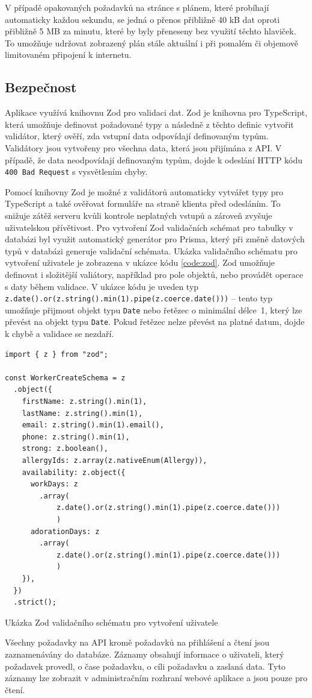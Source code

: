 V případě opakovaných požadavků na stránce s plánem, které probíhají automaticky každou sekundu, se jedná o přenos přibližně 40 kB dat oproti
přibližně 5 MB za minutu, které by byly přeneseny bez využití těchto hlaviček. To umožňuje udržovat zobrazený plán stále aktuální i při pomalém či objemově limitovaném
připojení k internetu.

\subsection{Bezpečnost}

Aplikace využívá knihovnu Zod pro validaci dat. Zod je knihovna pro TypeScript, která umožňuje definovat požadované typy a následně z těchto definic
vytvořit validátor, který ověří, zda vstupní data odpovídají definovaným typům. Validátory jsou vytvořeny pro všechna data, která jsou přijímána z API.
V případě, že data neodpovídají definovaným typům, dojde k odeslání HTTP kódu \texttt{400 Bad Request} s vysvětlením chyby.

Pomocí knihovny Zod je možné z validátorů automaticky vytvářet typy pro TypeScript a také ověřovat formuláře na straně klienta před odesláním.
To snižuje zátěž serveru kvůli kontrole neplatných vstupů a zároveň zvyšuje uživatelskou přívětivost.
Pro vytvoření Zod validačních schémat pro tabulky v databázi byl využit automatický generátor pro Prisma, který při změně datových typů v databázi
generuje validační schémata. Ukázka validačního schématu pro vytvoření uživatele je zobrazena v ukázce kódu \ref{code:zod}.
Zod umožňuje definovat i složitější valiátory, například pro pole objektů, nebo provádět operace s daty během validace.
V ukázce kódu je uveden typ \texttt{z.date().or(z.string().min(1).pipe(z.coerce.date()))} -- tento typ umožňuje přijmout objekt typu \texttt{Date} nebo řetězec o minimální
délce~1, který lze převést na objekt typu \texttt{Date}. Pokud řetězec nelze převést na platné datum, dojde k chybě a validace se nezdaří.

\begin{listing}[h]
    \begin{verbatim}
import { z } from "zod";

const WorkerCreateSchema = z
  .object({
    firstName: z.string().min(1),
    lastName: z.string().min(1),
    email: z.string().min(1).email(),
    phone: z.string().min(1),
    strong: z.boolean(),
    allergyIds: z.array(z.nativeEnum(Allergy)),
    availability: z.object({
      workDays: z
        .array(
            z.date().or(z.string().min(1).pipe(z.coerce.date()))
            )
      adorationDays: z
        .array(
            z.date().or(z.string().min(1).pipe(z.coerce.date()))
            )
    }),
  })
  .strict();
    \end{verbatim}
    \caption{Ukázka Zod validačního schématu pro vytvoření uživatele}
    \label{code:zod}
\end{listing}

Všechny požadavky na API kromě požadavků na přihlášení a čtení jsou zaznamenávány do databáze. Záznamy obsahují informace o uživateli, který požadavek
provedl, o čase požadavku, o cíli požadavku a zaslaná data. Tyto záznamy lze zobrazit v administračním rozhraní webové aplikace a jsou pouze pro čtení.